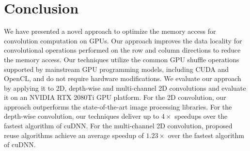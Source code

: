 \section{Conclusion}
We have presented a novel approach to optimize the memory access for convolution computation on GPUs. Our approach improves the data
locality for convolutional operations performed on the row and column directions to reduce the memory access. Our techniques utilize the
common GPU shuffle operations supported by mainstream GPU programming models, including CUDA and OpenCL, and do not require hardware
modifications. We evaluate our approach by applying it to 2D, depth-wise and multi-channel 2D convolutions and evaluate it on an NVIDIA RTX
2080Ti GPU platform. For the 2D convolution, our approach outperforms the state-of-the-art image processing libraries. For
the depth-wise convolution, our techniques deliver up to $4 \times$ speedups over the fastest algorithm of cuDNN. For the multi-channel 2D
convolution, proposed reuse algorithms achieve an average speedup of $1.23\times$ over the fastest algorithm of cuDNN.


